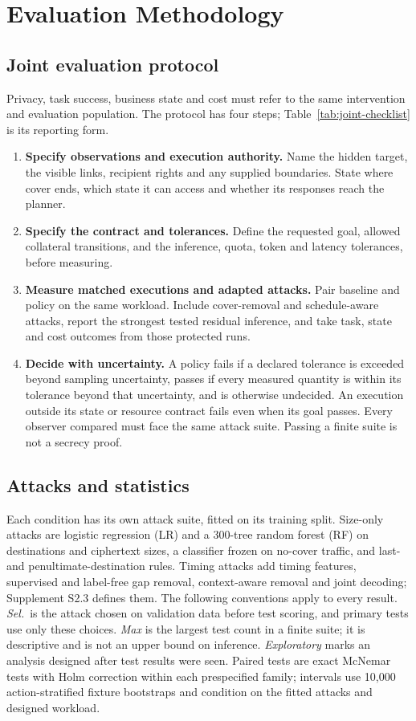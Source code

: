 \section{Evaluation Methodology}\label{sec:method}
\subsection{Joint evaluation protocol}
Privacy, task success, business state and cost must refer to the same intervention and evaluation population. The protocol has four steps; Table~\ref{tab:joint-checklist} is its reporting form.
\begin{enumerate}
\item \textbf{Specify observations and execution authority.} Name the hidden target, the visible links, recipient rights and any supplied boundaries. State where cover ends, which state it can access and whether its responses reach the planner.
\item \textbf{Specify the contract and tolerances.} Define the requested goal, allowed collateral transitions, and the inference, quota, token and latency tolerances, before measuring.
\item \textbf{Measure matched executions and adapted attacks.} Pair baseline and policy on the same workload. Include cover-removal and schedule-aware attacks, report the strongest tested residual inference, and take task, state and cost outcomes from those protected runs.
\item \textbf{Decide with uncertainty.} A policy fails if a declared tolerance is exceeded beyond sampling uncertainty, passes if every measured quantity is within its tolerance beyond that uncertainty, and is otherwise undecided. An execution outside its state or resource contract fails even when its goal passes. Every observer compared must face the same attack suite. Passing a finite suite is not a secrecy proof.
\end{enumerate}



\subsection{Attacks and statistics}\label{sec:stats}
Each condition has its own attack suite, fitted on its training split. Size-only attacks are logistic regression (LR) and a 300-tree random forest (RF) on destinations and ciphertext sizes, a classifier frozen on no-cover traffic, and last- and penultimate-destination rules. Timing attacks add timing features, supervised and label-free gap removal, context-aware removal and joint decoding; Supplement S2.3 defines them. The following conventions apply to every result. \emph{Sel.}\ is the attack chosen on validation data before test scoring, and primary tests use only these choices. \emph{Max} is the largest test count in a finite suite; it is descriptive and is not an upper bound on inference. \emph{Exploratory} marks an analysis designed after test results were seen. Paired tests are exact McNemar tests with Holm correction within each prespecified family; intervals use 10,000 action-stratified fixture bootstraps and condition on the fitted attacks and designed workload.

